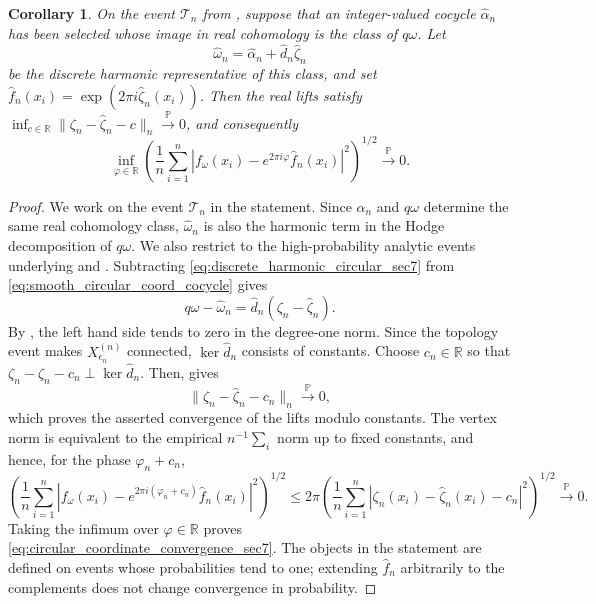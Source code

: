 \documentclass[11pt,reqno]{amsproc}
\numberwithin{equation}{section}
\newcommand{\R}{\mathbb{R}}
\newcommand{\PP}{\mathbb{P}}
\newcommand{\cT}{\mathcal{T}}
\newcommand{\homega}{\hat{\omega}}
\newtheorem{corollary}[counter]{Corollary}
\theoremstyle{definition}
\theoremstyle{plain}
\begin{document}
    \begin{corollary} \label{cor:circular_coordinate_convergence_sec7}
    On the event $\cT_n$ from , suppose that an integer-valued cocycle $\hat{\alpha}_n$ has been selected whose image in real cohomology is the class of $q\omega$.  Let
    \begin{equation} \label{eq:discrete_harmonic_circular_sec7}
        \homega_n=\hat{\alpha}_n+\hat{d}_n\hat{\zeta}_n
    \end{equation}
    be the discrete harmonic representative of this class, and set $\hat f_n(x_i)=\exp(2\pi i\hat{\zeta}_n(x_i))$.  Then the real lifts satisfy $\inf_{c\in\R}\|\zeta_n-\hat{\zeta}_n-c\|_n\xrightarrow{\PP}0$, and consequently
    \begin{equation} \label{eq:circular_coordinate_convergence_sec7}
        \inf_{\varphi\in \R}
        \left(
            \frac1n\sum_{i=1}^n
            \left|f_\omega(x_i)-e^{2\pi i\varphi}\hat f_n(x_i)\right|^2
        \right)^{1/2}
        \xrightarrow{\PP}0.
    \end{equation}
    \end{corollary}

    \begin{proof}
    We work on the event $\cT_n$ in the statement.  Since $\hat{\alpha}_n$ and $q\omega$ determine the same real cohomology class, $\homega_n$ is also the harmonic term in the Hodge decomposition of $q\omega$.  We also restrict to the high-probability analytic events underlying  and .  Subtracting \eqref{eq:discrete_harmonic_circular_sec7} from \eqref{eq:smooth_circular_coord_cocycle} gives
    \[
        q\omega-\homega_n
        =
        \hat{d}_n(\zeta_n-\hat{\zeta}_n).
    \]
    By , the left hand side tends to zero in the degree-one norm.  Since the topology event makes $X^{(n)}_{\epsilon_n}$ connected, $\ker\hat{d}_n$ consists of constants.  Choose $c_n\in\R$ so that $\zeta_n-\hat{\zeta}_n-c_n\perp \ker\hat{d}_n$.  Then,  gives
    \[
        \|\zeta_n-\hat{\zeta}_n-c_n\|_n\xrightarrow{\PP}0,
    \]
    which proves the asserted convergence of the lifts modulo constants.  The vertex norm is equivalent to the empirical $n^{-1}\sum_i$ norm up to fixed constants, and hence, for the phase $\varphi_n+c_n$,
    \[
        \left(
            \frac1n\sum_{i=1}^n
            \left|
            f_\omega(x_i)-e^{2\pi i(\varphi_n+c_n)}\hat f_n(x_i)
            \right|^2
        \right)^{1/2}
        \leq
        2\pi
        \left(
            \frac1n\sum_{i=1}^n
            \left|\zeta_n(x_i)-\hat{\zeta}_n(x_i)-c_n\right|^2
        \right)^{1/2}
        \xrightarrow{\PP}0.
    \]
    Taking the infimum over $\varphi\in\R$ proves \eqref{eq:circular_coordinate_convergence_sec7}.  The objects in the statement are defined on events whose probabilities tend to one; extending $\hat f_n$ arbitrarily to the complements does not change convergence in probability.
    \end{proof}
\end{document}
